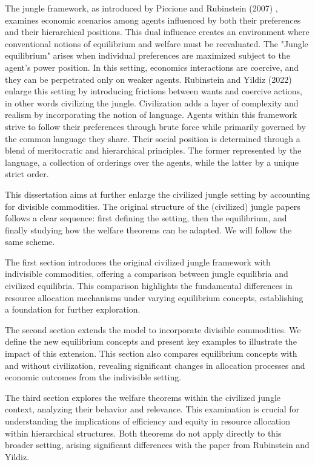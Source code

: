 \documentclass[12pt,a4paper]{article}
\numberwithin{theorem}{section}
\numberwithin{definition}{section}
\numberwithin{example}{section}
\numberwithin{exercise}{section}
\begin{document}
The jungle framework, as introduced by Piccione and Rubinstein (2007) \cite[PR]{P-R}, examines economic scenarios among agents influenced by both their preferences and their hierarchical positions. This dual influence creates an environment where conventional notions of equilibrium and welfare must be reevaluated. The "Jungle equilibrium" arises when individual preferences are maximized subject to the agent's power position. In this setting, economics interactions are coercive, and they can be perpetrated only on weaker agents. Rubinstein and Yildiz (2022) \cite[RY]{RY} enlarge this setting by introducing frictions between wants and coercive actions, in other words civilizing the jungle. Civilization adds a layer of complexity and realism by incorporating the notion of language. Agents within this framework strive to follow their preferences through brute force while primarily governed by the common language they share. Their social position is determined through a blend of meritocratic and hierarchical principles. The former represented by the language, a collection of orderings over the agents, while the latter by a unique strict order.

This dissertation aims at further enlarge the civilized jungle setting by accounting for divisible commodities. The original structure of the (civilized) jungle papers follows a clear sequence: first defining the setting, then the equilibrium, and finally studying how the welfare theorems can be adapted. We will follow the same scheme.

The first section introduces the original civilized jungle framework with indivisible commodities, offering a comparison between jungle equilibria and civilized equilibria. This comparison highlights the fundamental differences in resource allocation mechanisms under varying equilibrium concepts, establishing a foundation for further exploration.

The second section extends the model to incorporate divisible commodities. We define the new equilibrium concepts and present key examples to illustrate the impact of this extension. This section also compares equilibrium concepts with and without civilization, revealing significant changes in allocation processes and economic outcomes from the indivisible setting.

The third section explores the welfare theorems within the civilized jungle context, analyzing their behavior and relevance. This examination is crucial for understanding the implications of efficiency and equity in resource allocation within hierarchical structures. Both theorems do not apply directly to this broader setting, arising significant differences with the paper from Rubinstein and Yildiz.
\end{document}
